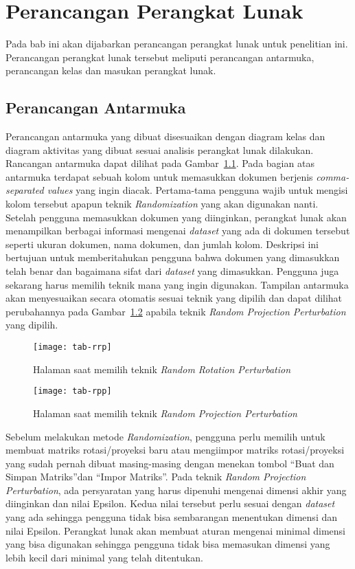 \chapter{Perancangan Perangkat Lunak}
\label{chap:perancangan}

Pada bab ini akan dijabarkan perancangan perangkat lunak untuk penelitian ini. Perancangan perangkat lunak tersebut meliputi perancangan antarmuka, perancangan kelas dan masukan perangkat lunak.

\section{Perancangan Antarmuka}
\label{sec:antarmuka}

Perancangan antarmuka yang dibuat disesuaikan dengan diagram kelas dan diagram aktivitas yang dibuat sesuai analisis perangkat lunak dilakukan. Rancangan antarmuka dapat dilihat pada Gambar~\ref{fig:tab-rrp}. Pada bagian atas antarmuka terdapat sebuah kolom untuk memasukkan dokumen berjenis \textit{comma-separated values} yang ingin diacak. Pertama-tama pengguna wajib untuk mengisi kolom tersebut apapun teknik \textit{Randomization} yang akan digunakan nanti. Setelah pengguna memasukkan dokumen yang diinginkan, perangkat lunak akan menampilkan berbagai informasi mengenai \textit{dataset} yang ada di dokumen tersebut seperti ukuran dokumen, nama dokumen, dan jumlah kolom. Deskripsi ini bertujuan untuk memberitahukan pengguna bahwa dokumen yang dimasukkan telah benar dan bagaimana sifat dari \textit{dataset} yang dimasukkan. Pengguna juga sekarang harus memilih teknik mana yang ingin digunakan. Tampilan antarmuka akan menyesuaikan secara otomatis sesuai teknik yang dipilih dan dapat dilihat perubahannya pada Gambar~\ref{fig:tab-rpp} apabila teknik \textit{Random Projection Perturbation} yang dipilih.

\begin{figure}
	\centering
	\texttt{[image: tab-rrp]}
	\caption{Halaman saat memilih teknik \textit{Random Rotation Perturbation}}
	\label{fig:tab-rrp}
\end{figure}

\begin{figure}
	\centering
	\texttt{[image: tab-rpp]}
	\caption{Halaman saat memilih teknik \textit{Random Projection Perturbation}}
	\label{fig:tab-rpp}
\end{figure}

Sebelum melakukan metode \textit{Randomization}, pengguna perlu memilih untuk membuat matriks rotasi/proyeksi baru atau mengiimpor matriks rotasi/proyeksi yang sudah pernah dibuat masing-masing dengan menekan tombol \textquotedblleft Buat dan Simpan Matriks\textquotedblright dan \textquotedblleft Impor Matriks\textquotedblright. Pada teknik \textit{Random Projection Perturbation}, ada persyaratan yang harus dipenuhi mengenai dimensi akhir yang diinginkan dan nilai Epsilon. Kedua nilai tersebut perlu sesuai dengan \textit{dataset} yang ada sehingga pengguna tidak bisa sembarangan menentukan dimensi dan nilai Epsilon. Perangkat lunak akan membuat aturan mengenai minimal dimensi yang bisa digunakan sehingga pengguna tidak bisa memasukan dimensi yang lebih kecil dari minimal yang telah ditentukan.


